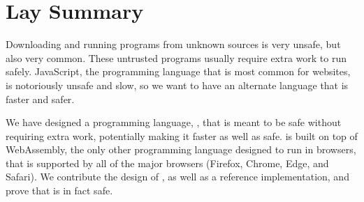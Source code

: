 \chapter{Lay Summary}
Downloading and running programs from unknown sources is very unsafe, but also very common.
These untrusted programs usually require extra work to run safely.
JavaScript, the programming language that is most common for websites, is notoriously unsafe and slow, so we want to have an alternate language that is faster and safer.

We have designed a programming language, \name, that is meant to be safe without requiring extra work, potentially making it faster as well as safe.
\name is built on top of WebAssembly, the only other programming language designed to run in browsers, that is supported by all of the major browsers (Firefox, Chrome, Edge, and Safari).
We contribute the design of \name, as well as a reference implementation, and prove that \name is in fact safe.
